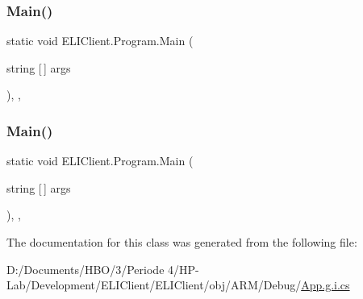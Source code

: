 \mbox{\label{class_e_l_i_client_1_1_program_a068c4621644e04f378693e706c77c2dd}} 
\subsubsection{\texorpdfstring{Main()}{Main()}\hspace{0.1cm}{\footnotesize\ttfamily [2/3]}}
{\footnotesize\ttfamily static void E\+L\+I\+Client.\+Program.\+Main (\begin{DoxyParamCaption}\item[{string \mbox{[}$\,$\mbox{]}}]{args }\end{DoxyParamCaption})\hspace{0.3cm}{\ttfamily [inline]}, {\ttfamily [static]}, {\ttfamily [private]}}

\mbox{\label{class_e_l_i_client_1_1_program_a068c4621644e04f378693e706c77c2dd}} 
\subsubsection{\texorpdfstring{Main()}{Main()}\hspace{0.1cm}{\footnotesize\ttfamily [3/3]}}
{\footnotesize\ttfamily static void E\+L\+I\+Client.\+Program.\+Main (\begin{DoxyParamCaption}\item[{string \mbox{[}$\,$\mbox{]}}]{args }\end{DoxyParamCaption})\hspace{0.3cm}{\ttfamily [inline]}, {\ttfamily [static]}, {\ttfamily [private]}}



The documentation for this class was generated from the following file\+:\begin{DoxyCompactItemize}
\item 
D\+:/\+Documents/\+H\+B\+O/3/\+Periode 4/\+H\+P-\/\+Lab/\+Development/\+E\+L\+I\+Client/\+E\+L\+I\+Client/obj/\+A\+R\+M/\+Debug/\hyperlink{_e_l_i_client_2_e_l_i_client_2obj_2_a_r_m_2_debug_2_app_8g_8i_8cs}{App.\+g.\+i.\+cs}\end{DoxyCompactItemize}
